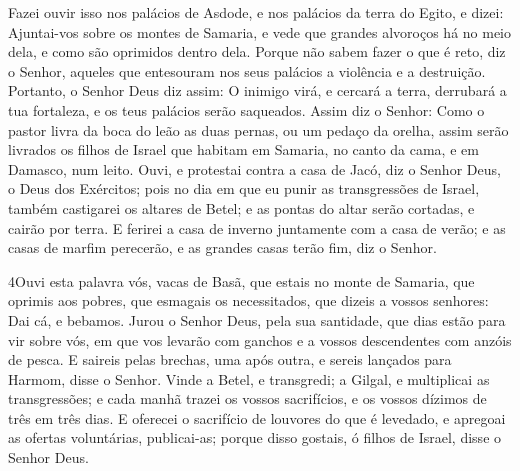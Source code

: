 Fazei ouvir isso nos palácios de Asdode, e nos palácios da terra
do Egito, e dizei: Ajuntai-vos sobre os montes de Samaria, e vede
que grandes alvoroços há no meio dela, e como são oprimidos dentro
dela. Porque não sabem fazer o que é reto, diz o Senhor,
aqueles que entesouram nos seus palácios a violência e a destruição.
Portanto, o Senhor Deus diz assim: O inimigo virá, e cercará
a terra, derrubará a tua fortaleza, e os teus palácios serão
saqueados. Assim diz o Senhor: Como o pastor livra da boca do
leão as duas pernas, ou um pedaço da orelha, assim serão livrados os
filhos de Israel que habitam em Samaria, no canto da cama, e em
Damasco, num leito. Ouvi, e protestai contra a casa de Jacó,
diz o Senhor Deus, o Deus dos Exércitos; pois no dia em que
eu punir as transgressões de Israel, também castigarei os altares de
Betel; e as pontas do altar serão cortadas, e cairão por terra.
E ferirei a casa de inverno juntamente com a casa de verão; e
as casas de marfim perecerão, e as grandes casas terão fim, diz o
Senhor.

\medskip

\lettrine{4} Ouvi esta palavra vós, vacas de Basã, que estais
no monte de Samaria, que oprimis aos pobres, que esmagais os
necessitados, que dizeis a vossos senhores: Dai cá, e bebamos.
Jurou o Senhor Deus, pela sua santidade, que dias estão para vir
sobre vós, em que vos levarão com ganchos e a vossos descendentes
com anzóis de pesca. E saireis pelas brechas, uma após outra, e
sereis lançados para Harmom, disse o Senhor. Vinde a Betel, e
transgredi; a Gilgal, e multiplicai as transgressões; e cada manhã
trazei os vossos sacrifícios, e os vossos dízimos de três em três
dias. E oferecei o sacrifício de louvores do que é levedado, e
apregoai as ofertas voluntárias, publicai-as; porque disso gostais,
ó filhos de Israel, disse o Senhor Deus.

